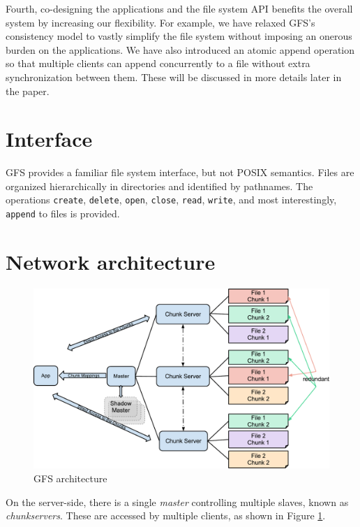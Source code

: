 \documentclass{article}
\begin{document}
Fourth, co-designing the applications and the file system API benefits the
overall system by increasing our flexibility.  For example, we have relaxed
GFS’s consistency model to vastly simplify the file system without imposing an
onerous burden on the applications. We have also introduced an atomic append
operation so that multiple clients can append concurrently to a file without
extra synchronization between them. These will be discussed in more details
later in the paper.

 \section{Interface}
 GFS provides a familiar file system interface, but not POSIX semantics.
 Files are organized hierarchically in directories
 and identified by pathnames. The operations \texttt{create},
 \texttt{delete}, \texttt{open}, \texttt{close}, \texttt{read}, \texttt{write},
 and most interestingly, \texttt{append} to files is provided.

\section{Network architecture}

\begin{figure}
\includegraphics[width=\textwidth]{gfs-diagram.pdf}
\caption{GFS architecture}
\label{fig:architecture}
\end{figure}

On the server-side, there is a single \emph{master} controlling multiple slaves,
known as \emph{chunkservers}. These are accessed by multiple clients, as
shown in  Figure \ref{fig:architecture}.



\nocite{*}
\end{document}
